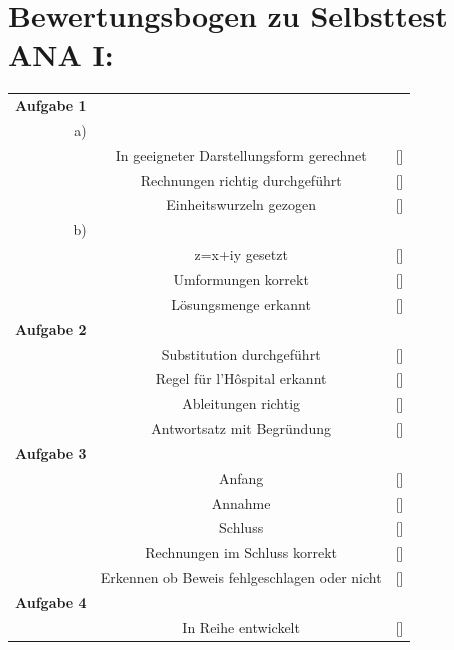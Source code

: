 \documentclass[11pt,final]{scrreprt}
\newcommand{\gbr} {\bigskip\\}
\begin{document}
\newpage
\section*{Bewertungsbogen zu Selbsttest ANA I:}

\begin{tabular}{rcl}
\textbf{Aufgabe 1} &  &  \\ 
a) &  &  \\ 
 & In geeigneter Darstellungsform gerechnet & [\hspace*{0.3cm}] \\ 
 & Rechnungen richtig durchgeführt & [\hspace*{0.3cm}] \\ 
 & Einheitswurzeln gezogen & [\hspace*{0.3cm}] \\ 
b) &  &  \\ 
 & z=x+iy gesetzt & [\hspace*{0.3cm}] \\ 
 & Umformungen korrekt & [\hspace*{0.3cm}] \\ 
 & Lösungsmenge erkannt & [\hspace*{0.3cm}] \gbr
\textbf{Aufgabe 2} &  &  \\ 
 & Substitution durchgeführt & [\hspace*{0.3cm}] \\ 
 & Regel für l'Hôspital erkannt & [\hspace*{0.3cm}] \\ 
 & Ableitungen richtig & [\hspace*{0.3cm}] \\ 
 & Antwortsatz mit Begründung & [\hspace*{0.3cm}] \gbr 
\textbf{Aufgabe 3} &  &  \\ 
 & Anfang & [\hspace*{0.3cm}] \\ 
 & Annahme & [\hspace*{0.3cm}] \\ 
 & Schluss & [\hspace*{0.3cm}] \\ 
 & Rechnungen im Schluss korrekt & [\hspace*{0.3cm}] \\ 
 & Erkennen ob Beweis fehlgeschlagen oder nicht & [\hspace*{0.3cm}] \gbr 
\textbf{Aufgabe 4} &  &  \\ 
 & In Reihe entwickelt & [\hspace*{0.3cm}] \\ 

\end{tabular}
\end{document}
